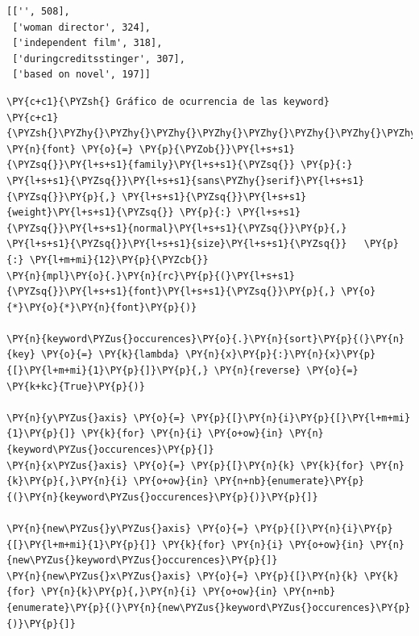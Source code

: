             \begin{tcolorbox}[breakable, boxrule=.5pt, size=fbox, pad at break*=1mm, opacityfill=0]
\begin{Verbatim}[commandchars=\\\{\}]
[['', 508],
 ['woman director', 324],
 ['independent film', 318],
 ['duringcreditsstinger', 307],
 ['based on novel', 197]]
\end{Verbatim}
\end{tcolorbox}
        
    \begin{tcolorbox}[breakable, size=fbox, boxrule=1pt, pad at break*=1mm,colback=cellbackground, colframe=cellborder]
\begin{Verbatim}[commandchars=\\\{\}]
\PY{c+c1}{\PYZsh{} Gráfico de ocurrencia de las keyword}
\PY{c+c1}{\PYZsh{}\PYZhy{}\PYZhy{}\PYZhy{}\PYZhy{}\PYZhy{}\PYZhy{}\PYZhy{}\PYZhy{}\PYZhy{}\PYZhy{}\PYZhy{}\PYZhy{}\PYZhy{}\PYZhy{}\PYZhy{}\PYZhy{}\PYZhy{}\PYZhy{}\PYZhy{}\PYZhy{}\PYZhy{}\PYZhy{}\PYZhy{}\PYZhy{}\PYZhy{}\PYZhy{}\PYZhy{}\PYZhy{}}
\PY{n}{font} \PY{o}{=} \PY{p}{\PYZob{}}\PY{l+s+s1}{\PYZsq{}}\PY{l+s+s1}{family}\PY{l+s+s1}{\PYZsq{}} \PY{p}{:} \PY{l+s+s1}{\PYZsq{}}\PY{l+s+s1}{sans\PYZhy{}serif}\PY{l+s+s1}{\PYZsq{}}\PY{p}{,} \PY{l+s+s1}{\PYZsq{}}\PY{l+s+s1}{weight}\PY{l+s+s1}{\PYZsq{}} \PY{p}{:} \PY{l+s+s1}{\PYZsq{}}\PY{l+s+s1}{normal}\PY{l+s+s1}{\PYZsq{}}\PY{p}{,} \PY{l+s+s1}{\PYZsq{}}\PY{l+s+s1}{size}\PY{l+s+s1}{\PYZsq{}}   \PY{p}{:} \PY{l+m+mi}{12}\PY{p}{\PYZcb{}}
\PY{n}{mpl}\PY{o}{.}\PY{n}{rc}\PY{p}{(}\PY{l+s+s1}{\PYZsq{}}\PY{l+s+s1}{font}\PY{l+s+s1}{\PYZsq{}}\PY{p}{,} \PY{o}{*}\PY{o}{*}\PY{n}{font}\PY{p}{)}

\PY{n}{keyword\PYZus{}occurences}\PY{o}{.}\PY{n}{sort}\PY{p}{(}\PY{n}{key} \PY{o}{=} \PY{k}{lambda} \PY{n}{x}\PY{p}{:}\PY{n}{x}\PY{p}{[}\PY{l+m+mi}{1}\PY{p}{]}\PY{p}{,} \PY{n}{reverse} \PY{o}{=} \PY{k+kc}{True}\PY{p}{)}

\PY{n}{y\PYZus{}axis} \PY{o}{=} \PY{p}{[}\PY{n}{i}\PY{p}{[}\PY{l+m+mi}{1}\PY{p}{]} \PY{k}{for} \PY{n}{i} \PY{o+ow}{in} \PY{n}{keyword\PYZus{}occurences}\PY{p}{]}
\PY{n}{x\PYZus{}axis} \PY{o}{=} \PY{p}{[}\PY{n}{k} \PY{k}{for} \PY{n}{k}\PY{p}{,}\PY{n}{i} \PY{o+ow}{in} \PY{n+nb}{enumerate}\PY{p}{(}\PY{n}{keyword\PYZus{}occurences}\PY{p}{)}\PY{p}{]}

\PY{n}{new\PYZus{}y\PYZus{}axis} \PY{o}{=} \PY{p}{[}\PY{n}{i}\PY{p}{[}\PY{l+m+mi}{1}\PY{p}{]} \PY{k}{for} \PY{n}{i} \PY{o+ow}{in} \PY{n}{new\PYZus{}keyword\PYZus{}occurences}\PY{p}{]}
\PY{n}{new\PYZus{}x\PYZus{}axis} \PY{o}{=} \PY{p}{[}\PY{n}{k} \PY{k}{for} \PY{n}{k}\PY{p}{,}\PY{n}{i} \PY{o+ow}{in} \PY{n+nb}{enumerate}\PY{p}{(}\PY{n}{new\PYZus{}keyword\PYZus{}occurences}\PY{p}{)}\PY{p}{]}


\end{Verbatim}
\end{tcolorbox}
